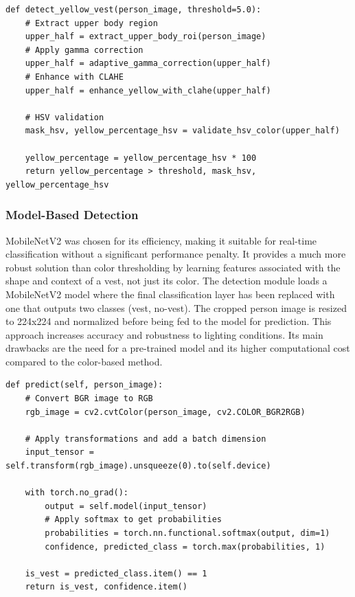 \documentclass[11pt, a4paper]{article}
\begin{document}
\begin{lstlisting}[caption={Image enhancement pipeline from `vision.py`.}, label={lst:color_vest}]
def detect_yellow_vest(person_image, threshold=5.0):
    # Extract upper body region
    upper_half = extract_upper_body_roi(person_image)
    # Apply gamma correction
    upper_half = adaptive_gamma_correction(upper_half)
    # Enhance with CLAHE
    upper_half = enhance_yellow_with_clahe(upper_half)

    # HSV validation
    mask_hsv, yellow_percentage_hsv = validate_hsv_color(upper_half)
    
    yellow_percentage = yellow_percentage_hsv * 100
    return yellow_percentage > threshold, mask_hsv, yellow_percentage_hsv
\end{lstlisting}

\subsubsection{Model-Based Detection}
MobileNetV2 was chosen for its efficiency, making it suitable for real-time classification without a significant performance penalty. It provides a much more robust solution than color thresholding by learning features associated with the shape and context of a vest, not just its color. The detection module loads a MobileNetV2 model where the final classification layer has been replaced with one that outputs two classes (vest, no-vest). The cropped person image is resized to 224x224 and normalized before being fed to the model for prediction. This approach increases accuracy and robustness to lighting conditions. Its main drawbacks are the need for a pre-trained model and its higher computational cost compared to the color-based method. \\

\begin{lstlisting}[caption={Prediction function from `vest\_classifier.py`.}, label={lst:model_vest}]
def predict(self, person_image):
    # Convert BGR image to RGB
    rgb_image = cv2.cvtColor(person_image, cv2.COLOR_BGR2RGB)

    # Apply transformations and add a batch dimension
    input_tensor = self.transform(rgb_image).unsqueeze(0).to(self.device)

    with torch.no_grad():
        output = self.model(input_tensor)
        # Apply softmax to get probabilities
        probabilities = torch.nn.functional.softmax(output, dim=1)
        confidence, predicted_class = torch.max(probabilities, 1)

    is_vest = predicted_class.item() == 1
    return is_vest, confidence.item()
\end{lstlisting}
\end{document}
